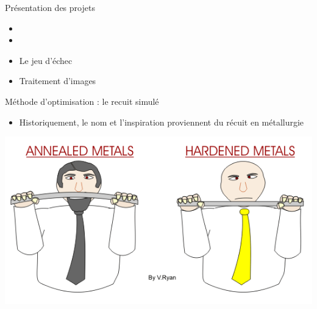 \documentclass[t, compress]{beamer}
\begin{document}
\begin{frame}[c, fragile]{Présentation des projets}






  \begin{itemize}

  \item {}
  \item {}
  \item Le jeu d'échec
  \item Traitement d'images

  \end{itemize}

\end{frame}

\begin{frame}[c, fragile]{Méthode d'optimisation : le recuit simulé}

  \begin{itemize}
  \item Historiquement, le nom et l'inspiration proviennent du récuit en
    métallurgie
  \end{itemize}

  \begin{center}
      \includegraphics[scale=0.5]{figures/heat-0}
  \end{center}

\end{frame}
\end{document}
